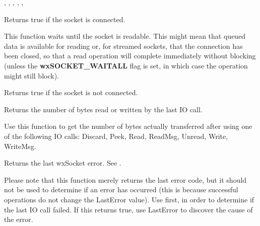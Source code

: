 , 
, 
, 
, 
, 

%
%
\label{wxsocketbaseisconnected}


Returns true if the socket is connected.

%
%
\label{wxsocketbaseisdata}


This function waits until the socket is readable. This might mean that
queued data is available for reading or, for streamed sockets, that
the connection has been closed, so that a read operation will complete
immediately without blocking (unless the {\bf wxSOCKET\_WAITALL} flag
is set, in which case the operation might still block).

\label{wxsocketbaseisdisconnected}

%
%

Returns true if the socket is not connected.

\label{wxsocketbaselastcount}

%
%

Returns the number of bytes read or written by the last IO call.

Use this function to get the number of bytes actually transferred
after using one of the following IO calls: Discard, Peek, Read,
ReadMsg, Unread, Write, WriteMsg.

%
%
\label{wxsocketbaselasterror}


Returns the last wxSocket error. See .

Please note that this function merely returns the last error code,
but it should not be used to determine if an error has occurred (this
is because successful operations do not change the LastError value).
Use  first, in order to determine
if the last IO call failed. If this returns true, use LastError
to discover the cause of the error.

